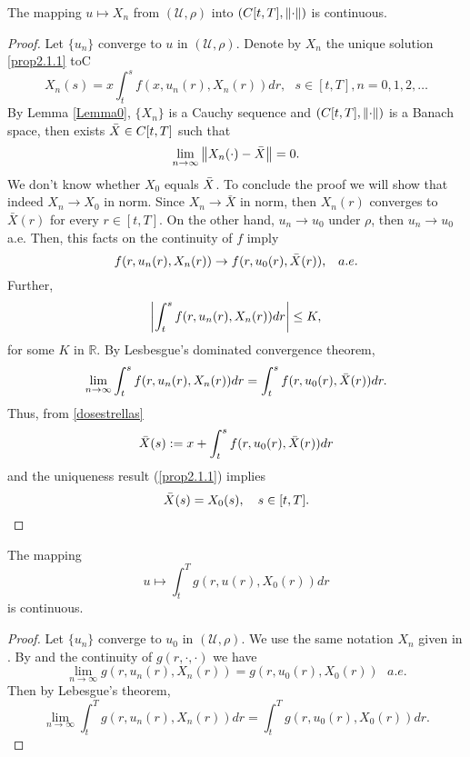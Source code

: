 \begin{proposition}\label{Proposition1}
    The mapping $u \mapsto X_{n}$ from $(\mathscr{U}, \rho)$ into $(C[t,T], \left\lVert\cdot\right\rVert)$ is continuous.
\end{proposition}
\begin{proof}
    Let $\{u_{n}\}$ converge to $u$ in $(\mathscr{U},\rho)$. Denote by $X_{n}$ the unique solution \cref{prop2.1.1} toC
    \begin{equation}\label{dosestrellas}
        X_{n}(s)=x\int_{t}^{s} f(x, u_{n}(r), X_{n}(r))dr, \ \ \ s\in [t,T], n=0,1,2,\ldots
    \end{equation}
    By Lemma \ref{Lemma0}, $\{ X_{n}\}$ is a Cauchy sequence and $(C[t,T], \left\lVert\cdot\right\rVert)$ %
    is a Banach space, then exists $\Bar{X}\in C[t, T]$ such that 
    $$
        \lim_{n\to\infty}\left\lVert X_{n}(\cdot)-\Bar{X}\right\rVert=0.
    $$
    We don't know whether $X_{0}$ equals $\Bar{X}$. To conclude the proof we will show 
    that indeed $X_{n}\to X_{0}$ in norm. Since $X_{n}\to\bar{X}$ in norm, then 
    $X_{n}(r)$ converges to $\bar{X}(r)$ for every $r\in[t, T]$. On the other hand, 
    $u_{n}\to u_{0}$ under $\rho$, then $u_{n}\to u_{0}$ a.e. Then, this facts on 
    the continuity of $f$ imply
    $$
        f(r, u_{n}(r), X_{n}(r))\to f(r, u_{0}(r), \Bar{X}(r)), \, \ \ a.e.
    $$
    Further,
    $$
        \left\lvert\int_{t}^{s} f(r, u_{n}(r), X_{n}(r))dr\right\rvert\leq K,
    $$
    for some $K$ in $\mathbb{R}$. By Lesbesgue's dominated convergence theorem,
    $$
        \lim_{n\to\infty}\int_{t}^{s}f(r, u_{n}(r), X_{n}(r))dr%
        = \int_{t}^{s}f(r, u_{0}(r), \Bar{X}(r))dr.
    $$
    Thus, from \eqref{dosestrellas}
    $$
        \Bar{X}(s):= x+ \int_{t}^{s}f(r, u_{0}(r),\Bar{X}(r))dr
    $$
    and the uniqueness result (\cref{prop2.1.1}) implies 
    $$
        \Bar{X}(s)=X_{0}(s), \ \ \ s\in [t, T].
    $$
\end{proof}
\begin{theorem}\label{Thm:Jcontinuity}
    The mapping 
    $$
        u \mapsto \int_{t}^{T}g(r, u(r), X_0(r))dr
    $$
    is continuous.
\end{theorem}
\begin{proof}
    Let $\{u_{n}\}$ converge to $u_{0}$ in $(\mathscr{U},\rho)$. We use the 
    same notation $X_{n}$ given in . By  
    and the continuity of $g(r, \cdot, \cdot)$ we have
    $$
        \lim_{n\to\infty}g(r, u_{n}(r), X_{n}(r)) = g(r, u_{0}(r), X_{0}(r)) \ \ \ a.e.
    $$
    Then by Lebesgue's theorem,
    $$
        \lim_{n\to\infty}\int_{t}^{T}g(r, u_{n}(r), X_{n}(r))dr=\int_{t}^{T}%
        g(r, u_{0}(r), X_{0}(r))dr.
    $$
\end{proof}

